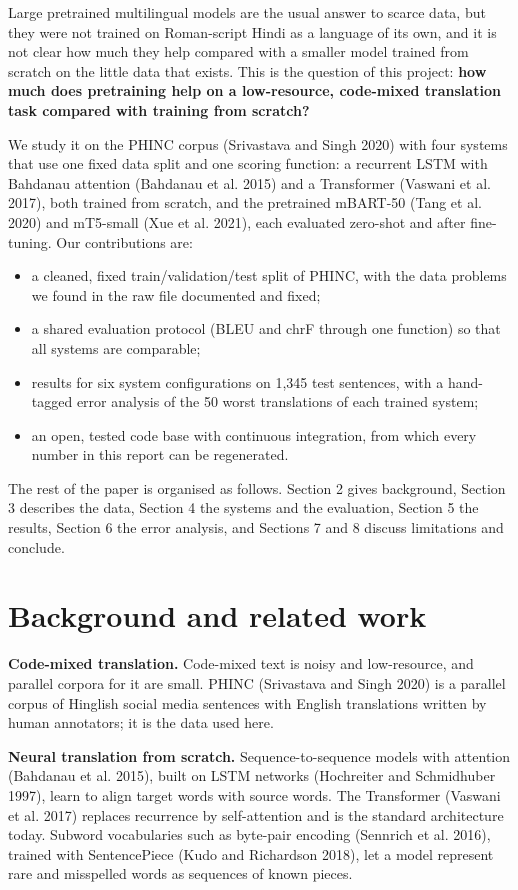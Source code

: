 \documentclass[11pt,a4paper]{article}
\begin{document}
Large pretrained multilingual models are the usual answer to scarce data, but they were not trained on Roman-script Hindi as a language of its own, and it is not clear how much they help compared with a smaller model trained from scratch on the little data that exists. This is the question of this project: \textbf{how much does pretraining help on a low-resource, code-mixed translation task compared with training from scratch?}

We study it on the PHINC corpus (Srivastava and Singh 2020) with four systems that use one fixed data split and one scoring function: a recurrent LSTM with Bahdanau attention (Bahdanau et al. 2015) and a Transformer (Vaswani et al. 2017), both trained from scratch, and the pretrained mBART-50 (Tang et al. 2020) and mT5-small (Xue et al. 2021), each evaluated zero-shot and after fine-tuning. Our contributions are:

\begin{itemize}\setlength\itemsep{0pt}
\item a cleaned, fixed train/validation/test split of PHINC, with the data problems we found in the raw file documented and fixed;
\item a shared evaluation protocol (BLEU and chrF through one function) so that all systems are comparable;
\item results for six system configurations on 1,345 test sentences, with a hand-tagged error analysis of the 50 worst translations of each trained system;
\item an open, tested code base with continuous integration, from which every number in this report can be regenerated.
\end{itemize}
The rest of the paper is organised as follows. Section 2 gives background, Section 3 describes the data, Section 4 the systems and the evaluation, Section 5 the results, Section 6 the error analysis, and Sections 7 and 8 discuss limitations and conclude.

\section{Background and related work}
\textbf{Code-mixed translation.} Code-mixed text is noisy and low-resource, and parallel corpora for it are small. PHINC (Srivastava and Singh 2020) is a parallel corpus of Hinglish social media sentences with English translations written by human annotators; it is the data used here.

\textbf{Neural translation from scratch.} Sequence-to-sequence models with attention (Bahdanau et al. 2015), built on LSTM networks (Hochreiter and Schmidhuber 1997), learn to align target words with source words. The Transformer (Vaswani et al. 2017) replaces recurrence by self-attention and is the standard architecture today. Subword vocabularies such as byte-pair encoding (Sennrich et al. 2016), trained with SentencePiece (Kudo and Richardson 2018), let a model represent rare and misspelled words as sequences of known pieces.
\end{document}

